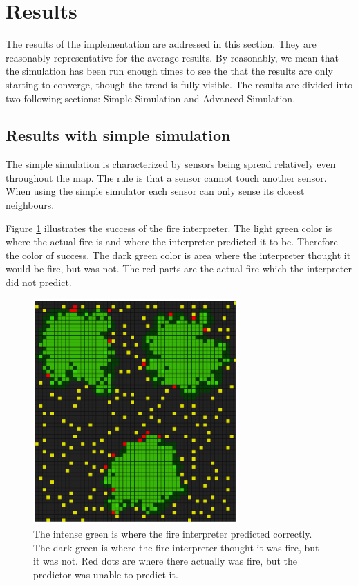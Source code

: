 \section{Results}
The results of the implementation are addressed in this section. They are reasonably representative for the average results. By reasonably, we mean that the simulation has been run enough times to see the that the results are only starting to converge, though the trend is fully visible. The results are divided into two following sections: Simple Simulation and Advanced Simulation.

\subsection{Results with simple simulation}
The simple simulation is characterized by sensors being spread relatively even throughout the map. The rule is that a sensor cannot touch another sensor. When using the simple simulator each sensor can only sense its closest neighbours. 

Figure \ref{fig:simple-results1} illustrates the success of the fire interpreter. The light green color is where the actual fire is and where the interpreter predicted it to be. Therefore the color of success. The dark green color is area where the interpreter thought it would be fire, but was not. The red parts are the actual fire which the interpreter did not predict.

\begin{figure}[here]
  \centering
      \includegraphics[width=0.7\textwidth]{discussion/graphics/results-simple-compare.png}
  \caption{The intense green is where the fire interpreter predicted correctly. The dark green is where the fire interpreter thought it was fire, but it was not. Red dots are where there actually was fire, but the predictor was unable to predict it.}
  \label{fig:simple-results1}
\end{figure}

